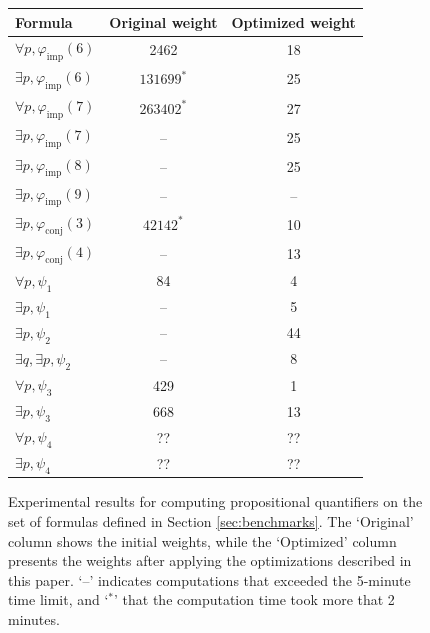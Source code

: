 \documentclass[english,review]{jflart}
\theoremstyle{definition}
\theoremstyle{plain}
\renewcommand{\phi}{\varphi}
\begin{document}
\begin{figure}[htp]
	\centering
	\begin{tabular}{|l||c|c|}
		\hline
		Formula                             & Original weight & Optimized weight \\
		\hline
		$\forall p, \phi_{\text{imp}} (6)$  & 2462            & 18               \\
		$\exists p, \phi_{\text{imp}} (6)$  & $131699^*$      & 25               \\
		$\forall p, \phi_{\text{imp}} (7)$  & $263402^*$      & 27               \\
		$\exists p, \phi_{\text{imp}} (7)$  & --              & 25               \\
		$\exists p, \phi_{\text{imp}} (8)$  & --              & 25               \\
		$\exists p, \phi_{\text{imp}} (9)$  & --              & --               \\
		$\exists p, \phi_{\text{conj}} (3)$ & $42142^*$           & 10               \\
		$\exists p, \phi_{\text{conj}} (4)$ & --              & 13               \\
		$\forall p, \psi_1$                   & 84              & 4                \\
		$\exists p, \psi_1$                   & --              & 5                \\
		$\exists p, \psi_2$                 & --              & 44               \\
		$\exists q, \exists p, \psi_2$      & --              & 8                \\
		$\forall p, \psi_3$                 & 429             & 1                \\
		$\exists p, \psi_3$                 & 668             & 13               \\
		$\forall p, \psi_4$                 & ??             & ??               \\
		$\exists p, \psi_4$                 & ??             & ??               \\
		\hline
	\end{tabular}
	\caption{Experimental results for computing propositional quantifiers on the set of formulas defined in Section \ref{sec:benchmarks}. The `Original' column shows the initial weights, while the `Optimized' column presents the weights after applying the optimizations described in this paper. `--' indicates computations that exceeded the 5-minute time limit, and `$^*$' that the computation time took more that 2 minutes.}
	\label{tab:quant-improvements}
\end{figure}
\end{document}
